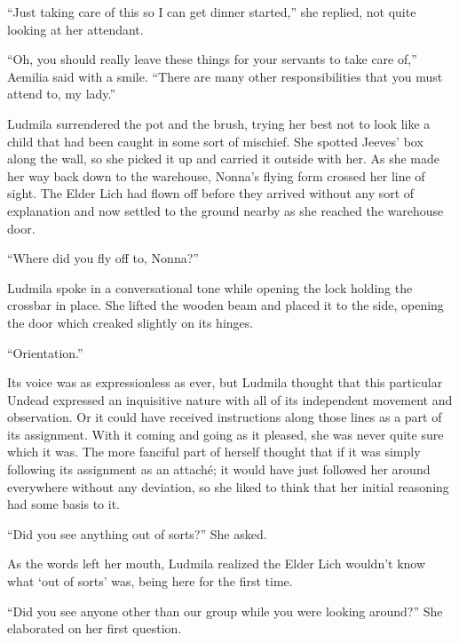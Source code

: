  

“Just taking care of this so I can get dinner started,” she replied, not quite looking at her attendant.

 

“Oh, you should really leave these things for your servants to take care of,” Aemilia said with a smile. “There are many other responsibilities that you must attend to, my lady.”

 

Ludmila surrendered the pot and the brush, trying her best not to look like a child that had been caught in some sort of mischief. She spotted Jeeves’ box along the wall, so she picked it up and carried it outside with her. As she made her way back down to the warehouse, Nonna’s flying form crossed her line of sight. The Elder Lich had flown off before they arrived without any sort of explanation and now settled to the ground nearby as she reached the warehouse door.

 

“Where did you fly off to, Nonna?”

 

Ludmila spoke in a conversational tone while opening the lock holding the crossbar in place. She lifted the wooden beam and placed it to the side, opening the door which creaked slightly on its hinges.

 

“Orientation.”

 

Its voice was as expressionless as ever, but Ludmila thought that this particular Undead expressed an inquisitive nature with all of its independent movement and observation. Or it could have received instructions along those lines as a part of its assignment. With it coming and going as it pleased, she was never quite sure which it was. The more fanciful part of herself thought that if it was simply following its assignment as an attaché; it would have just followed her around everywhere without any deviation, so she liked to think that her initial reasoning had some basis to it.

 

“Did you see anything out of sorts?” She asked.

 

As the words left her mouth, Ludmila realized the Elder Lich wouldn’t know what ‘out of sorts’ was, being here for the first time.

 

“Did you see anyone other than our group while you were looking around?” She elaborated on her first question.

